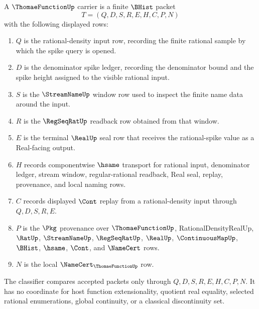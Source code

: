 \begin{definition}
\label{def:thomae-function-carrier}
A $\ThomaeFunctionUp$ carrier is a finite $\BHist$ packet
$$
T=(Q,D,S,R,E,H,C,P,N)
$$
with the following displayed rows:
\begin{enumerate}
\item $Q$ is the rational-density input row, recording the finite rational sample by which the spike query is opened.
\item $D$ is the denominator spike ledger, recording the denominator bound and the spike height assigned to the visible rational input.
\item $S$ is the $\StreamNameUp$ window row used to inspect the finite name data around the input.
\item $R$ is the $\RegSeqRatUp$ readback row obtained from that window.
\item $E$ is the terminal $\RealUp$ seal row that receives the rational-spike value as a Real-facing output.
\item $H$ records componentwise $\hsame$ transport for rational input, denominator ledger, stream window, regular-rational readback, Real seal, replay, provenance, and local naming rows.
\item $C$ records displayed $\Cont$ replay from a rational-density input through $Q,D,S,R,E$.
\item $P$ is the $\Pkg$ provenance over $\ThomaeFunctionUp$, RationalDensityRealUp, $\RatUp$, $\StreamNameUp$, $\RegSeqRatUp$, $\RealUp$, $\ContinuousMapUp$, $\BHist$, $\hsame$, $\Cont$, and $\NameCert$ rows.
\item $N$ is the local $\NameCert_{\ThomaeFunctionUp}$ row.
\end{enumerate}
The classifier compares accepted packets only through $Q,D,S,R,E,H,C,P,N$. It has no coordinate for host function extensionality, quotient real equality, selected rational enumerations, global continuity, or a classical discontinuity set.
\end{definition}

